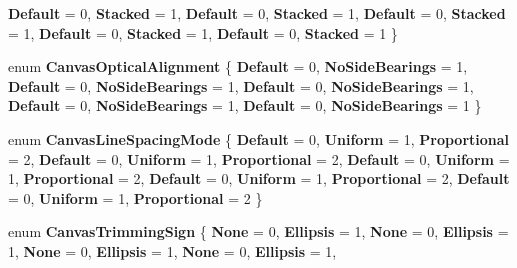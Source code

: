 \begin{DoxyCompactItemize}
{\bfseries Default} = 0, 
{\bfseries Stacked} = 1, 
{\bfseries Default} = 0, 
{\bfseries Stacked} = 1, 
\newline
{\bfseries Default} = 0, 
{\bfseries Stacked} = 1, 
{\bfseries Default} = 0, 
{\bfseries Stacked} = 1, 
\newline
{\bfseries Default} = 0, 
{\bfseries Stacked} = 1
 \}
\item 
\mbox{\label{namespace_microsoft_1_1_graphics_1_1_canvas_1_1_text_aa1f89365afa2b2891e65edc60ec74cdd}} 
enum {\bfseries Canvas\+Optical\+Alignment} \{ \newline
{\bfseries Default} = 0, 
{\bfseries No\+Side\+Bearings} = 1, 
{\bfseries Default} = 0, 
{\bfseries No\+Side\+Bearings} = 1, 
\newline
{\bfseries Default} = 0, 
{\bfseries No\+Side\+Bearings} = 1, 
{\bfseries Default} = 0, 
{\bfseries No\+Side\+Bearings} = 1, 
\newline
{\bfseries Default} = 0, 
{\bfseries No\+Side\+Bearings} = 1
 \}
\item 
\mbox{\label{namespace_microsoft_1_1_graphics_1_1_canvas_1_1_text_a0af1601f34ce8114935e99af136dc8cc}} 
enum {\bfseries Canvas\+Line\+Spacing\+Mode} \{ \newline
{\bfseries Default} = 0, 
{\bfseries Uniform} = 1, 
{\bfseries Proportional} = 2, 
{\bfseries Default} = 0, 
\newline
{\bfseries Uniform} = 1, 
{\bfseries Proportional} = 2, 
{\bfseries Default} = 0, 
{\bfseries Uniform} = 1, 
\newline
{\bfseries Proportional} = 2, 
{\bfseries Default} = 0, 
{\bfseries Uniform} = 1, 
{\bfseries Proportional} = 2, 
\newline
{\bfseries Default} = 0, 
{\bfseries Uniform} = 1, 
{\bfseries Proportional} = 2
 \}
\item 
\mbox{\label{namespace_microsoft_1_1_graphics_1_1_canvas_1_1_text_a891e2d3429f4e8717d79bdd171ed64a0}} 
enum {\bfseries Canvas\+Trimming\+Sign} \{ \newline
{\bfseries None} = 0, 
{\bfseries Ellipsis} = 1, 
{\bfseries None} = 0, 
{\bfseries Ellipsis} = 1, 
\newline
{\bfseries None} = 0, 
{\bfseries Ellipsis} = 1, 
{\bfseries None} = 0, 
{\bfseries Ellipsis} = 1, 

\end{DoxyCompactItemize}
